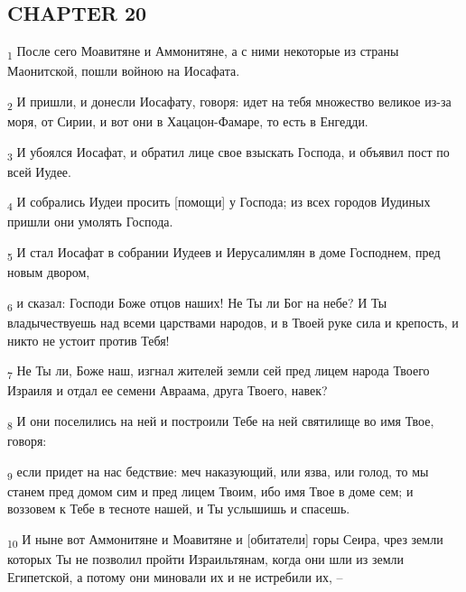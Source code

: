 \subsection{CHAPTER 20}
\begin{tcolorbox}
\textsubscript{1} После сего Моавитяне и Аммонитяне, а с ними некоторые из страны Маонитской, пошли войною на Иосафата.
\end{tcolorbox}
\begin{tcolorbox}
\textsubscript{2} И пришли, и донесли Иосафату, говоря: идет на тебя множество великое из-за моря, от Сирии, и вот они в Хацацон-Фамаре, то есть в Енгедди.
\end{tcolorbox}
\begin{tcolorbox}
\textsubscript{3} И убоялся Иосафат, и обратил лице свое взыскать Господа, и объявил пост по всей Иудее.
\end{tcolorbox}
\begin{tcolorbox}
\textsubscript{4} И собрались Иудеи просить [помощи] у Господа; из всех городов Иудиных пришли они умолять Господа.
\end{tcolorbox}
\begin{tcolorbox}
\textsubscript{5} И стал Иосафат в собрании Иудеев и Иерусалимлян в доме Господнем, пред новым двором,
\end{tcolorbox}
\begin{tcolorbox}
\textsubscript{6} и сказал: Господи Боже отцов наших! Не Ты ли Бог на небе? И Ты владычествуешь над всеми царствами народов, и в Твоей руке сила и крепость, и никто не устоит против Тебя!
\end{tcolorbox}
\begin{tcolorbox}
\textsubscript{7} Не Ты ли, Боже наш, изгнал жителей земли сей пред лицем народа Твоего Израиля и отдал ее семени Авраама, друга Твоего, навек?
\end{tcolorbox}
\begin{tcolorbox}
\textsubscript{8} И они поселились на ней и построили Тебе на ней святилище во имя Твое, говоря:
\end{tcolorbox}
\begin{tcolorbox}
\textsubscript{9} если придет на нас бедствие: меч наказующий, или язва, или голод, то мы станем пред домом сим и пред лицем Твоим, ибо имя Твое в доме сем; и воззовем к Тебе в тесноте нашей, и Ты услышишь и спасешь.
\end{tcolorbox}
\begin{tcolorbox}
\textsubscript{10} И ныне вот Аммонитяне и Моавитяне и [обитатели] горы Сеира, чрез земли которых Ты не позволил пройти Израильтянам, когда они шли из земли Египетской, а потому они миновали их и не истребили их, --
\end{tcolorbox}
